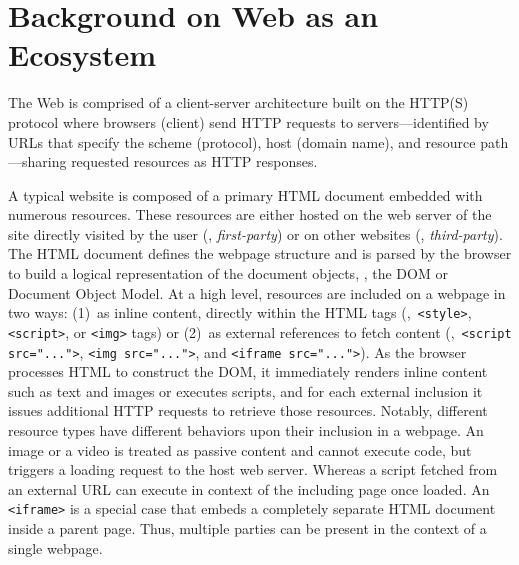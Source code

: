 \section{Background on Web as an Ecosystem}
\label{sec:background}

The Web is comprised of a client-server architecture built on the HTTP(S) protocol where browsers (client) send HTTP requests to servers---identified by URLs that specify the scheme (protocol), host (domain name), and resource path---sharing requested resources as HTTP responses.
%

%
A typical website is composed of a primary HTML document embedded with numerous resources. 
%
These resources are either hosted on the web server of the site directly visited by the user (\ie{}, \textit{first-party}) or on other websites (\ie{}, \textit{third-party}).
%
The HTML document defines the webpage structure and is parsed by the browser to build a logical representation of the document objects, \ie{}, the DOM or Document Object Model. 
%
At a high level, resources are included on a webpage in two ways: (1)~as inline content, directly within the HTML tags (\eg{},~\texttt{<style>}, \texttt{<script>}, or \texttt{<img>} tags) or (2)~as external references to fetch content (\eg{},~\texttt{<script src="...">}, \texttt{<img src="...">}, and \texttt{<iframe src="...">}). 
%
As the browser processes HTML to construct the DOM, it immediately renders inline content such as text and images or executes scripts, and for each external inclusion it issues additional HTTP requests to retrieve those resources. 
%
%
Notably, different resource types have different behaviors upon their inclusion in a webpage.
%
An image or a video is treated as passive content and cannot execute code, but triggers a loading request to the host web server.
%
Whereas a script fetched from an external URL can execute in context of the including page once loaded.
%
An \texttt{<iframe>} is a special case that embeds a completely separate HTML document inside a parent page.
%
Thus, multiple parties can be present in the context of a single webpage.


